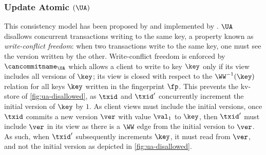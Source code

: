 \subsubsection{Update Atomic $(\UA)$}
This consistency model has been proposed by \citet{framework-concur} 
and implemented by \citet{rola}.
$\UA$ disallows concurrent transactions writing to the same key,
a property known as \emph{write-conflict freedom}:  
when two transactions write to the same key, one must see the version 
written by the other.
Write-conflict freedom is enforced by $\cancommitname_{\UA}$ which allows a client to write to key $\key$ only if its view includes all versions of $\key$; 
\ie its view is closed with respect to the $\WW^{-1}(\key)$ relation for all keys $\key$ written in the fingerprint $\fp$.
This prevents the kv-store of \cref{fig:ua-disallowed},
as $\txid$ and $\txid'$ concurrently increment the initial version of $\key$ by $1$.
As client views must include the initial versions, once $\txid$ commits a new version $\ver$ with value $\val_1$ to $\key$, then $\txid'$ must include $\ver$ in its view as there is a $\WW$ edge from the initial version to $\ver$. 
As such, when $\txid'$ subsequently increments $\key$, it must read from $\ver$, and not the initial version as depicted in \cref{fig:ua-disallowed}.



